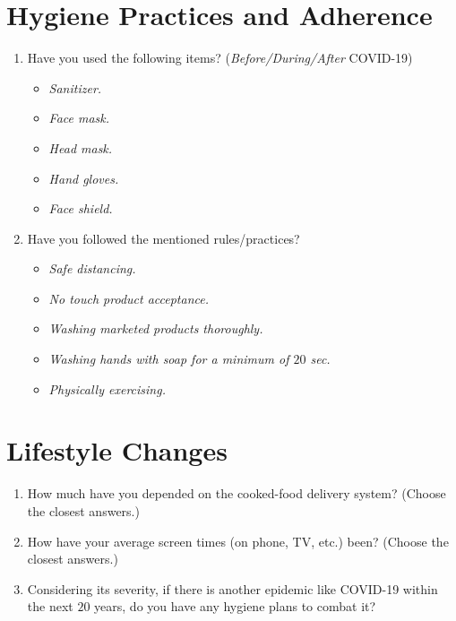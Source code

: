 \section*{Hygiene Practices and Adherence}
\begin{enumerate}[resume]
    \item Have you used the following items? (\textit{Before/During/After} COVID-19)
    \begin{itemize}
        \item \textit{Sanitizer.}
        \item \textit{Face mask.}
        \item \textit{Head mask.}
        \item \textit{Hand gloves.}
        \item \textit{Face shield.}
    \end{itemize}
    \item Have you followed the mentioned rules/practices?
    \begin{itemize}
        \item \textit{Safe distancing.}
        \item \textit{No touch product acceptance.}
        \item \textit{Washing marketed products thoroughly.}
        \item \textit{Washing hands with soap for a minimum of $20$ sec.}
        \item \textit{Physically exercising.}
    \end{itemize}
\end{enumerate}

\section*{Lifestyle Changes}
\begin{enumerate}[resume]
    \item How much have you depended on the cooked-food delivery system? (Choose the closest answers.)
    \item How have your average screen times (on phone, TV, etc.) been? (Choose the closest answers.)
    \item Considering its severity, if there is another epidemic like COVID-19 within the next $20$ years, do you have any hygiene plans to combat it?
\end{enumerate}


